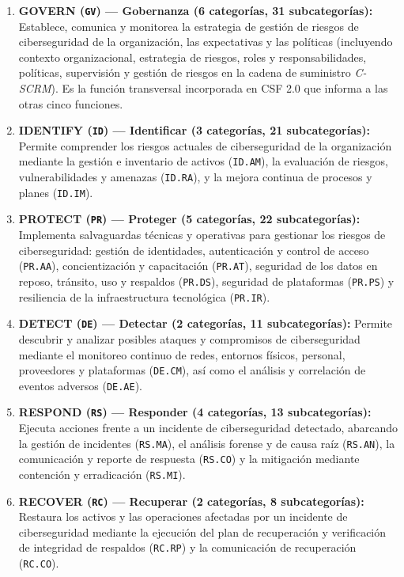 \documentclass[letterpaper,11pt]{article}
\begin{document}
\begin{enumerate}[leftmargin=1.2cm, itemsep=2pt]
    \item \textbf{GOVERN (\texttt{GV}) --- Gobernanza (6 categorías, 31 subcategorías):} Establece, comunica y monitorea la estrategia de gestión de riesgos de ciberseguridad de la organización, las expectativas y las políticas (incluyendo contexto organizacional, estrategia de riesgos, roles y responsabilidades, políticas, supervisión y gestión de riesgos en la cadena de suministro \textit{C-SCRM}). Es la función transversal incorporada en CSF 2.0 que informa a las otras cinco funciones.
    \item \textbf{IDENTIFY (\texttt{ID}) --- Identificar (3 categorías, 21 subcategorías):} Permite comprender los riesgos actuales de ciberseguridad de la organización mediante la gestión e inventario de activos (\texttt{ID.AM}), la evaluación de riesgos, vulnerabilidades y amenazas (\texttt{ID.RA}), y la mejora continua de procesos y planes (\texttt{ID.IM}).
    \item \textbf{PROTECT (\texttt{PR}) --- Proteger (5 categorías, 22 subcategorías):} Implementa salvaguardas técnicas y operativas para gestionar los riesgos de ciberseguridad: gestión de identidades, autenticación y control de acceso (\texttt{PR.AA}), concientización y capacitación (\texttt{PR.AT}), seguridad de los datos en reposo, tránsito, uso y respaldos (\texttt{PR.DS}), seguridad de plataformas (\texttt{PR.PS}) y resiliencia de la infraestructura tecnológica (\texttt{PR.IR}).
    \item \textbf{DETECT (\texttt{DE}) --- Detectar (2 categorías, 11 subcategorías):} Permite descubrir y analizar posibles ataques y compromisos de ciberseguridad mediante el monitoreo continuo de redes, entornos físicos, personal, proveedores y plataformas (\texttt{DE.CM}), así como el análisis y correlación de eventos adversos (\texttt{DE.AE}).
    \item \textbf{RESPOND (\texttt{RS}) --- Responder (4 categorías, 13 subcategorías):} Ejecuta acciones frente a un incidente de ciberseguridad detectado, abarcando la gestión de incidentes (\texttt{RS.MA}), el análisis forense y de causa raíz (\texttt{RS.AN}), la comunicación y reporte de respuesta (\texttt{RS.CO}) y la mitigación mediante contención y erradicación (\texttt{RS.MI}).
    \item \textbf{RECOVER (\texttt{RC}) --- Recuperar (2 categorías, 8 subcategorías):} Restaura los activos y las operaciones afectadas por un incidente de ciberseguridad mediante la ejecución del plan de recuperación y verificación de integridad de respaldos (\texttt{RC.RP}) y la comunicación de recuperación (\texttt{RC.CO}).
\end{enumerate}
\end{document}
